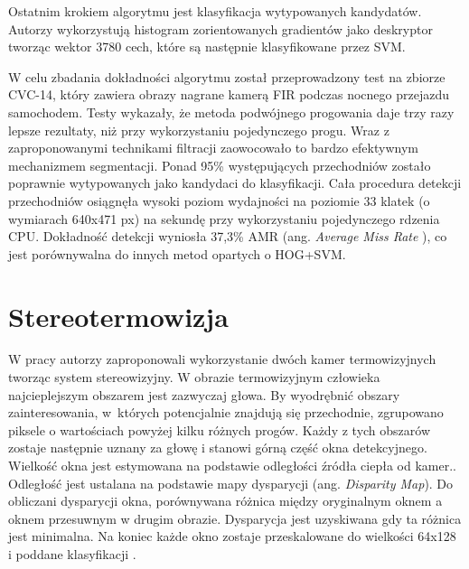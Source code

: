 Ostatnim krokiem algorytmu jest klasyfikacja wytypowanych kandydatów. 
Autorzy wykorzystują histogram zorientowanych gradientów jako deskryptor tworząc wektor 3780 cech, które są następnie klasyfikowane przez SVM.

W celu zbadania dokładności algorytmu został przeprowadzony test na zbiorze CVC-14, który zawiera obrazy nagrane kamerą FIR podczas nocnego przejazdu samochodem. 
Testy wykazały, że metoda podwójnego progowania daje trzy razy lepsze rezultaty, niż przy wykorzystaniu pojedynczego progu.  Wraz z zaproponowanymi technikami filtracji zaowocowało to bardzo efektywnym mechanizmem segmentacji. Ponad 95\% występujących przechodniów zostało poprawnie wytypowanych jako kandydaci do klasyfikacji. 
Cała procedura detekcji przechodniów osiągnęła wysoki poziom wydajności na poziomie 33 klatek (o wymiarach 640x471 px) na sekundę przy wykorzystaniu pojedynczego rdzenia CPU. Dokładność detekcji wyniosła 37,3\% AMR
(ang. \textit{ Average Miss Rate }), co jest porównywalna do innych metod opartych o HOG+SVM.

\section{Stereotermowizja}
W pracy \cite{suard2006pedestrian} autorzy zaproponowali wykorzystanie dwóch kamer termowizyjnych tworząc system stereowizyjny. W obrazie termowizyjnym człowieka najcieplejszym obszarem jest zazwyczaj głowa. By wyodrębnić obszary zainteresowania, w~których potencjalnie znajdują się przechodnie, zgrupowano piksele o wartościach powyżej kilku różnych progów. Każdy z tych obszarów zostaje następnie uznany za głowę i stanowi górną część okna detekcyjnego. Wielkość okna jest estymowana na podstawie odległości źródła ciepła od kamer.. Odległość jest ustalana na podstawie mapy dysparycji (ang. \textit{Disparity Map}). Do obliczani dysparycji okna, porównywana różnica między oryginalnym oknem a oknem przesuwnym w drugim obrazie. Dysparycja jest uzyskiwana gdy ta różnica jest minimalna. Na koniec każde okno zostaje przeskalowane do wielkości 64x128 i poddane klasyfikacji . %

